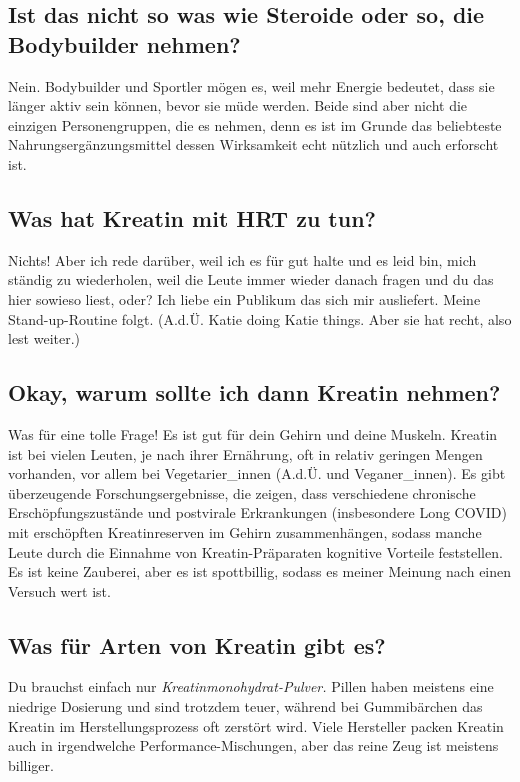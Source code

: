 \documentclass{article}
\begin{document}
\subsection{Ist das nicht so was wie Steroide oder so, die Bodybuilder nehmen?}

Nein. Bodybuilder und Sportler mögen es, weil mehr Energie bedeutet, dass sie länger aktiv sein können, bevor sie müde werden. Beide sind aber nicht die einzigen Personengruppen, die es nehmen, denn es ist im Grunde das beliebteste Nahrungsergänzungsmittel dessen Wirksamkeit echt nützlich und auch erforscht ist.

\subsection{Was hat Kreatin mit HRT zu tun?}

Nichts! Aber ich rede darüber, weil ich es für gut halte und es leid bin, mich ständig zu wiederholen, weil die Leute immer wieder danach fragen und du das hier sowieso liest, oder? Ich liebe ein Publikum das sich mir ausliefert. Meine Stand-up-Routine folgt. (A.d.Ü. Katie doing Katie things. Aber sie hat recht, also lest weiter.)

\subsection{Okay, warum sollte ich dann Kreatin nehmen?}

Was für eine tolle Frage! Es ist gut für dein Gehirn und deine Muskeln. Kreatin ist bei vielen Leuten, je nach ihrer Ernährung, oft in relativ geringen Mengen vorhanden, vor allem bei Vegetarier\_innen (A.d.Ü. und Veganer\_innen). Es gibt überzeugende Forschungsergebnisse, die zeigen, dass verschiedene chronische Erschöpfungszustände und postvirale Erkrankungen (insbesondere Long COVID) mit erschöpften Kreatinreserven im Gehirn zusammenhängen, sodass manche Leute durch die Einnahme von Kreatin-Präparaten kognitive Vorteile feststellen. Es ist keine Zauberei, aber es ist spottbillig, sodass es meiner Meinung nach einen Versuch wert ist.

\subsection{Was für Arten von Kreatin gibt es?}

Du brauchst einfach nur \textit{Kreatinmonohydrat-Pulver.} Pillen haben meistens eine niedrige Dosierung und sind trotzdem teuer, während bei Gummibärchen das Kreatin im Herstellungsprozess oft zerstört wird. Viele Hersteller packen Kreatin auch in irgendwelche Performance-Mischungen, aber das reine Zeug ist meistens billiger.
\end{document}
